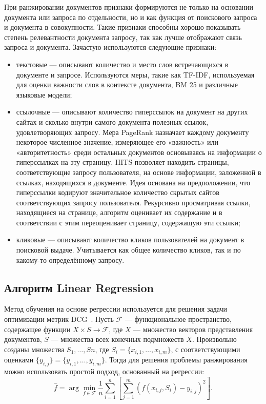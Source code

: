 При ранжировании документов признаки формируются не только на основании документа или запроса по отдельности, но и как функция от поискового запроса и документа в совокупности. Такие признаки способны хорошо показывать степень релевантности документа запросу, так как лучше отображают связь запроса и документа.
Зачастую используются следующие признаки:
\begin{itemize}[label=---]
	\item текстовые --- описывают количество и место слов встречающихся в документе и запросе. Используются меры, такие как TF-IDF, используемая для оценки важности слов в контексте документа, BM 25 и различные языковые модели;
	\item ссылочные --- описывают количество гиперссылок на документ на других сайтах и сколько внутри самого документа полезных ссылок, удовлетворяющих запросу. Мера PageRank назначает каждому документу некоторое численное значение, измеряющее его «важность» или «авторитетность» среди остальных документов основываясь на информации о гиперссылках на эту страницу.   HITS позволяет находить страницы, соответствующие запросу пользователя, на основе информации, заложенной в ссылках, находящихся в документе. Идея основана на предположении, что гиперссылки кодируют значительное количество скрытых сайтов соответствующих запросу пользователя. Рекурсивно просматривая ссылки, находящиеся на странице, алгоритм оценивает их содержание и в соответствии с этим переоценивает страницу, содержащую эти ссылки;
	\item кликовые --- описывают количество кликов пользователей на документ в поисковой выдаче. Учитывается как общее количество кликов, так и по какому-то определённому запросу.
\end{itemize}

\subsection{Алгоритм Linear Regression}

 Метод обучения на основе регрессии используется для решения задачи оптимизации метрик DCG~\cite{LR}. Пусть $\mathcal{F}$ --- функциональное пространство, содержащее функции $X \times S \to \mathcal{F}$, где $X$ --- множество векторов представления документов, $S$ --- множества всех конечных подмножеств $X$. Произвольно созданы множества $S_{1}, \dots, S{n}$, где $S_{i} = \{x_{i,1}, \dots, x_{i,m}\}$, с соответствующими оценками $\{y_{i,j}\} = \{y_{i,1}, \dots, y_{i,m}\}$. Тогда для решения проблемы ранжирования можно использовать простой подход, основанный на регрессии:
\begin{equation}
	\label{eq:LR1}
	\hat{f}=\arg \min _{f \in \mathcal{F}} \frac{1}{n} \sum_{i=1}^n[\sum_{j=1}^m(f(x_{i, j}, S_i)-y_{i, j})^2].
\end{equation}

